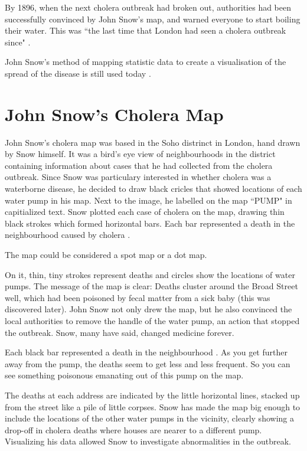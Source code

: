 \documentclass[12pt]{article}
\begin{document}
By 1896, when the next cholera outbreak had broken out, authorities had been successfully convinced by John Snow's map, and warned everyone to start boiling their water. This was ``the last time that London had seen a cholera outbreak since" \cite{tedtalk}.

John Snow's method of mapping statistic data to create a visualisation of the spread of the disease is still used today \cite{channel1}. 

\section{John Snow's Cholera Map}

John Snow's cholera map was based in the Soho distrinct in London, hand drawn by Snow himself. It was a bird's eye view of neighbourhoods in the district containing information about cases that he had collected from the cholera outbreak. Since Snow was particulary interested in whether cholera was a waterborne disease, he decided to draw black cricles that showed locations of each water pump in his map. Next to the image, he labelled on the map ``PUMP" in capitialized text. Snow plotted each case of cholera on the map, drawing thin black strokes which formed horizontal bars. Each bar represented a death in the neighbourhood caused by cholera \cite{tedtalk}.


The map could be considered a spot map or a dot map. 



On it, thin, tiny strokes represent deaths and circles show the locations of water pumps. The message of the map is clear: Deaths cluster around the Broad Street well, which had been poisoned by fecal matter from a sick baby (this was discovered later). John Snow not only drew the map, but he also convinced the local authorities to remove the handle of the water pump, an action that stopped the outbreak. Snow, many have said, changed medicine forever. \cite{heros}

Each black bar represented a death in the neighbourhood \cite{tedtalk}. As you get further away from the pump, the deaths seem to get less and less frequent. So you can see something poisonous emanating out of this pump on the map. 

The deaths at each address are indicated by the little horizontal lines, stacked up from the street like a pile of little corpses. Snow has made the map big enough to include the locations of the other water pumps in the vicinity, clearly showing a drop-off in cholera deaths where houses are nearer to a different pump. Visualizing his data allowed Snow to investigate abnormalities in the outbreak. \cite{blog}
\end{document}
